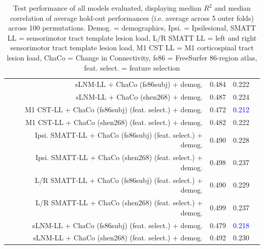 \documentclass[10pt]{article}
\newcommand{\colorProcessBlue}[1]{\textcolor{ProcessBlue}{#1}}
\newcommand{\colorNavyBlue}[1]{\textcolor{NavyBlue}{#1}}
\newcommand{\colorBlue}[1]{\textcolor{Blue}{#1}}
\begin{document}
\begin{table}[h]
\begin{tabular}{lrrrr}
 & sLNM-LL + ChaCo (fs86subj) + demog. & \colorNavyBlue{0.484} & \colorNavyBlue{0.222} \\
 & sLNM-LL + ChaCo (shen268) + demog. & \colorNavyBlue{0.487} & \colorNavyBlue{0.224} \\
 & M1 CST-LL + ChaCo (fs86subj) (feat. select.) + demog. & \colorNavyBlue{0.472} & \colorBlue{0.212} \\
 & M1 CST-LL + ChaCo (shen268) (feat. select.) + demog. & \colorNavyBlue{0.482} & \colorNavyBlue{0.222} \\
 & Ipsi. SMATT-LL + ChaCo (fs86subj) (feat. select.) + demog. & \colorProcessBlue{0.490} & \colorNavyBlue{0.228} \\
 & Ipsi. SMATT-LL + ChaCo (shen268) (feat. select.) + demog. & \colorProcessBlue{0.498} & \colorProcessBlue{0.237} \\
 & L/R SMATT-LL + ChaCo (fs86subj) (feat. select.) + demog. & \colorProcessBlue{0.490} & \colorNavyBlue{0.229} \\
 & L/R SMATT-LL + ChaCo (shen268) (feat. select.) + demog. & \colorProcessBlue{0.499} & \colorProcessBlue{0.237} \\
 & sLNM-LL + ChaCo (fs86subj) (feat. select.) + demog. & \colorNavyBlue{0.479} & \colorBlue{0.218} \\
 & sLNM-LL + ChaCo (shen268) (feat. select.) + demog. & \colorProcessBlue{0.492} & \colorProcessBlue{0.230} \\
\bottomrule
\end{tabular}
\caption{Test performance of all models evaluated, displaying median $R^2$ and median correlation of average hold-out performances (i.e. average across 5 outer folds) across 100 permutations. Demog. = demographics, Ipsi. = Ipsilesional, SMATT LL = sensorimotor tract template lesion load, L/R SMATT LL = left and right sensorimotor tract template lesion load, M1 CST LL = M1 corticospinal tract lesion load, ChaCo = Change in Connectivity, fs86 = FreeSurfer 86-region atlas, feat. select. = feature selection}
\label{results_table_acutechronic}
\end{table}
\end{document}
